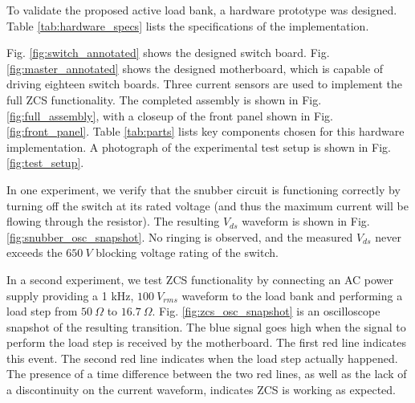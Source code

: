 \documentclass{article}
\begin{document}
To validate the proposed active load bank, a hardware prototype was designed. Table \ref{tab:hardware_specs} lists the specifications of the implementation.

Fig. \ref{fig:switch_annotated} shows the designed switch board. Fig. \ref{fig:master_annotated} shows the designed motherboard, which is capable of driving eighteen switch boards. Three current sensors are used to implement the full ZCS functionality. The completed assembly is shown in Fig. \ref{fig:full_assembly}, with a closeup of the front panel shown in Fig. \ref{fig:front_panel}. Table \ref{tab:parts} lists key components chosen for this hardware implementation. A photograph of the experimental test setup is shown in Fig. \ref{fig:test_setup}.

In one experiment, we verify that the snubber circuit is functioning correctly by turning off the switch at its rated voltage (and thus the maximum current will be flowing through the resistor). The resulting $V_{ds}$ waveform is shown in Fig. \ref{fig:snubber_osc_snapshot}. No ringing is observed, and the measured $V_{ds}$ never exceeds the $650\:V$ blocking voltage rating of the switch.

In a second experiment, we test ZCS functionality by connecting an AC power supply providing a 1 kHz, $100\:V_{rms}$ waveform to the load bank and performing a load step from $50\:\Omega$ to $16.7\:\Omega$. Fig. \ref{fig:zcs_osc_snapshot} is an oscilloscope snapshot of the resulting transition. The blue signal goes high when the signal to perform the load step is received by the motherboard. The first red line indicates this event. The second red line indicates when the load step actually happened. The presence of a time difference between the two red lines, as well as the lack of a discontinuity on the current waveform, indicates ZCS is working as expected.



\vspace{0.5cm}
\end{document}
